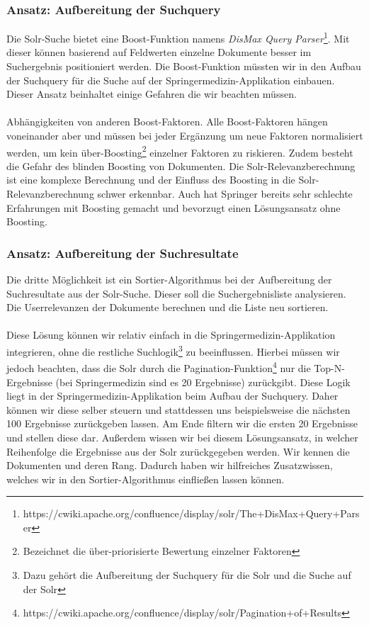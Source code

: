 \subsubsection{Ansatz: Aufbereitung der Suchquery}
\label{sec:Einfuehrung:Methodik:SucheEinbinden:Suchquery}

Die Solr-Suche bietet eine Boost-Funktion namens \textit{DisMax Query Parser}\footnote{https://cwiki.apache.org/confluence/display/solr/The+DisMax+Query+Parser}.  Mit dieser können basierend auf Feldwerten einzelne Dokumente besser im Suchergebnis positioniert werden. Die Boost-Funktion müssten wir in den Aufbau der Suchquery für die Suche auf der Springermedizin-Applikation einbauen. Dieser Ansatz beinhaltet einige Gefahren die wir beachten müssen.
\\
\\
Abhängigkeiten von anderen Boost-Faktoren. Alle Boost-Faktoren hängen voneinander aber und müssen bei jeder Ergänzung um neue Faktoren normalisiert werden, um kein \glqq über-Boosting\grqq{}\footnote{Bezeichnet die über-priorisierte Bewertung einzelner Faktoren} einzelner Faktoren zu riskieren. Zudem besteht die Gefahr des \glqq blinden\grqq{} Boosting von Dokumenten. Die Solr-Relevanzberechnung ist eine komplexe Berechnung und der Einfluss des Boosting in die Solr-Relevanzberechnung schwer erkennbar. Auch hat Springer bereits sehr schlechte Erfahrungen mit Boosting gemacht und bevorzugt einen Lösungsansatz ohne Boosting.

\subsubsection{Ansatz: Aufbereitung der Suchresultate}
\label{sec:Einfuehrung:Methodik:SucheEinbinden:Suchresultate}

Die dritte Möglichkeit ist ein Sortier-Algorithmus bei der Aufbereitung der Suchresultate aus der Solr-Suche. Dieser soll die Suchergebnisliste analysieren. Die Userrelevanzen der Dokumente berechnen und die Liste neu sortieren. 
\\
\\
Diese Lösung können wir relativ einfach in die Springermedizin-Applikation integrieren, ohne die restliche Suchlogik\footnote{Dazu gehört die Aufbereitung der Suchquery für die Solr und die Suche auf der Solr} zu beeinflussen. Hierbei müssen wir jedoch beachten, dass die Solr durch die Pagination-Funktion\footnote{https://cwiki.apache.org/confluence/display/solr/Pagination+of+Results} nur die Top-N-Ergebnisse (bei Springermedizin sind es 20 Ergebnisse) zurückgibt. Diese Logik liegt in der Springermedizin-Applikation beim Aufbau der Suchquery. Daher können wir diese selber steuern und stattdessen uns beispielsweise die nächsten 100 Ergebnisse zurückgeben lassen. Am Ende filtern wir die ersten 20 Ergebnisse und stellen diese dar. Außerdem wissen wir bei diesem Lösungsansatz, in welcher Reihenfolge die Ergebnisse aus der Solr zurückgegeben werden. Wir kennen die Dokumenten und deren Rang. Dadurch haben wir hilfreiches Zusatzwissen, welches wir in den Sortier-Algorithmus einfließen lassen können.

